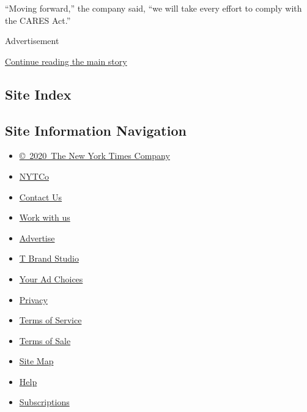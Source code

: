 ``Moving forward,'' the company said, ``we will take every effort to
comply with the CARES Act.''

Advertisement

\protect\hyperlink{after-bottom}{Continue reading the main story}

\hypertarget{site-index}{%
\subsection{Site Index}\label{site-index}}

\hypertarget{site-information-navigation}{%
\subsection{Site Information
Navigation}\label{site-information-navigation}}

\begin{itemize}
\tightlist
\item
  \href{https://help.nytimes.com/hc/en-us/articles/115014792127-Copyright-notice}{©~2020~The
  New York Times Company}
\end{itemize}

\begin{itemize}
\tightlist
\item
  \href{https://www.nytco.com/}{NYTCo}
\item
  \href{https://help.nytimes.com/hc/en-us/articles/115015385887-Contact-Us}{Contact
  Us}
\item
  \href{https://www.nytco.com/careers/}{Work with us}
\item
  \href{https://nytmediakit.com/}{Advertise}
\item
  \href{http://www.tbrandstudio.com/}{T Brand Studio}
\item
  \href{https://www.nytimes.com/privacy/cookie-policy\#how-do-i-manage-trackers}{Your
  Ad Choices}
\item
  \href{https://www.nytimes.com/privacy}{Privacy}
\item
  \href{https://help.nytimes.com/hc/en-us/articles/115014893428-Terms-of-service}{Terms
  of Service}
\item
  \href{https://help.nytimes.com/hc/en-us/articles/115014893968-Terms-of-sale}{Terms
  of Sale}
\item
  \href{https://spiderbites.nytimes.com}{Site Map}
\item
  \href{https://help.nytimes.com/hc/en-us}{Help}
\item
  \href{https://www.nytimes.com/subscription?campaignId=37WXW}{Subscriptions}
\end{itemize}
